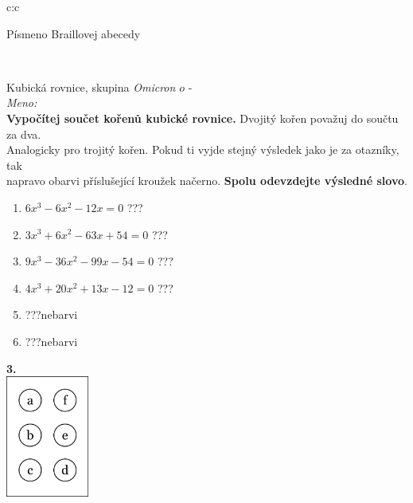 \documentclass[10pt]{report}
\newcommand\omicron{o}
\begin{document}
\begin{tabular}{c:c}
\begin{minipage}[c][99mm][t]{0.49\linewidth}
\begin{center}
\begin{minipage}{0.20\linewidth}
\begin{center}
{\small Písmeno Braillovej abecedy}
\end{center}
\end{minipage}
\end{center}
\end{minipage}
\\ \hdashline
\begin{minipage}[c][99mm][t]{0.49\linewidth}
\begin{center}
\vspace{7mm}
{\huge Kubická rovnice, skupina \textit{Omicron $\omicron$} -}\\[4.5mm]
\textit{Meno:}\phantom{xxxxxxxxxxxxxxxxxxxxxxxxxxxxxxxxxxxxxxxxxxxxxxxxxxxxxxxxxxxxxxxxx}\\[3.5mm]
\textbf{Vypočítej součet kořenů kubické rovnice.} Dvojitý kořen považuj do součtu za dva.\\Analogicky pro trojitý kořen. Pokud ti vyjde stejný výsledek jako je za otazníky, tak\\napravo obarvi příslušející kroužek načerno. \textbf{Spolu odevzdejte výsledné slovo}.\\[3mm]
\begin{minipage}{0.77\linewidth}
\begin{center}
\begin{varwidth}{\textwidth}
\begin{enumerate}
\large
\item $6x^3-6x^2-12x=0$\quad \dotfill\; ???\;\dotfill {}
\item $3x^3+6x^2-63x+54=0$\quad \dotfill\; ???\;\dotfill {}
\item $9x^3-36x^2-99x-54=0$\quad \dotfill\; ???\;\dotfill {}
\item $4x^3+20x^2+13x-12=0$\quad \dotfill\; ???\;\dotfill {}
\item \quad \dotfill\; ???\;\dotfill \quad nebarvi
\item \quad \dotfill\; ???\;\dotfill \quad nebarvi
\end{enumerate}
\end{varwidth}
\end{center}
\end{minipage}
\begin{minipage}{0.20\linewidth}
\begin{center}
{\Huge\bfseries 3.} \\[2mm]
\includegraphics[height=40mm]{../images/braille.png}

\end{center}
\end{minipage}
\end{center}
\end{minipage}
\end{tabular}
\end{document}
